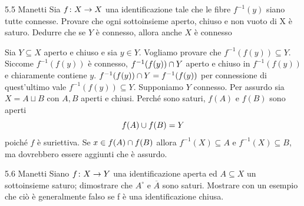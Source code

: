 \documentclass[a4paper]{article}
\begin{document}
\begin{snippetexercise}{5.5 Manetti}
    Sia \(f\colon X \to X\) una identificazione tale che le fibre \(f^{-1}(y)\) siano tutte
    connesse. Provare che ogni sottoinsieme aperto, chiuso e non vuoto di X è
    saturo. Dedurre che se \(Y\) è connesso, allora anche \(X\) è connesso
\end{snippetexercise}

\begin{snippetsolution}{}
    Sia \(Y \subseteq X\) aperto e chiuso e sia \(y \in Y\).
    Vogliamo provare che \(f^{-1}(f(y)) \subseteq Y\).
    Siccome \(f^{-1}(f(y))\) è connesso, \(f^{-1}(f(y)) \cap Y\) aperto e chiuso in
    \(f^{-1}(f(y))\) e chiaramente contiene \(y\).
    \(f^{-1}(f(y)) \cap Y = f^{-1}(f(y))\)
    per connessione di quest'ultimo vale \(f^{-1}(f(y)) \subseteq Y\).
    Supponiamo \(Y\) connesso. Per assurdo sia \(X = A \sqcup B\) con \(A,B\) aperti e chiusi.
    Perché sono saturi, \(f(A)\) e \(f(B)\) sono aperti
    \[
        f(A) \cup f(B) = Y
    \]
    poiché \(f\) è suriettiva. Se \(x \in f(A) \cap f(B)\)
    allora \(f^{-1}(X) \subseteq A\) e \(f^{-1}(X) \subseteq B\), ma dovrebbero essere aggiunti che è assurdo.
\end{snippetsolution}

\begin{snippetexercise}{5.6 Manetti}
    Siano \(f\colon X \to Y\) una identificazione aperta ed \(A \subseteq X\) un sottoinsieme saturo;
    dimostrare che \(A^\circ\) e \(\overline{A}\) sono saturi. Mostrare con un esempio che
    ciò è generalmente falso se f è una identificazione chiusa.
\end{snippetexercise}

\end{document}
